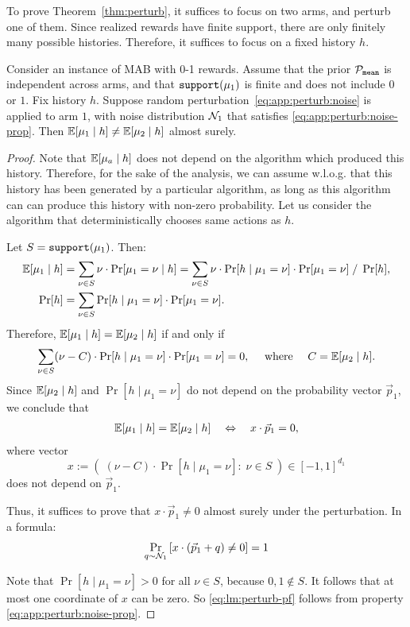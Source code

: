 To prove Theorem~\ref{thm:perturb}, it suffices to focus on two arms, and perturb one of them. Since realized rewards have finite support, there are only finitely many possible histories. Therefore, it suffices to focus on a fixed history $h$.

\begin{lemma}\label{lm:perturb}
Consider an instance of MAB with 0-1 rewards. Assume that the prior $\mathcal{P}_\mathtt{mean}$ is independent across arms, and that $\mathtt{support}(\mu_1)$ is finite and does not include $0$ or $1$. Fix history $h$. Suppose random perturbation~\eqref{eq:app:perturb:noise} is applied to arm $1$, with noise distribution $\mathcal{N}_1$ that satisfies \eqref{eq:app:perturb:noise-prop}. Then
    $\E[\mu_1\mid h] \neq \E[\mu_2\mid h] $
almost surely.
\end{lemma}

\begin{proof}
Note that $\E[\mu_a\mid h]$ does not depend on the algorithm which produced this history. Therefore, for the sake of the analysis, we can assume w.l.o.g. that this history has been generated by a particular algorithm, as long as this algorithm can can produce this history with non-zero probability. Let us consider  the algorithm that deterministically chooses same actions as $h$.

Let $S = \mathtt{support}(\mu_1)$. Then:
\begin{align*}
\E[\mu_1\mid h]
    &= \sum_{\nu\in S} \nu \cdot \Pr[\mu_1 =\nu \mid h]
    = \sum_{\nu\in S} \nu \cdot \Pr[h \mid \mu_1 =\nu] \cdot \Pr[\mu_1=\nu]\;/\;\Pr[h], \\
\Pr[h]
    &= \sum_{\nu\in S} \Pr[h \mid \mu_1 =\nu] \cdot \Pr[\mu_1=\nu].
\end{align*}
Therefore,
    $\E[\mu_1\mid h] = \E[\mu_2\mid h] $
if and only if
\begin{align*}
\sum_{\nu\in S} (\nu-C) \cdot \Pr[h \mid \mu_1 =\nu] \cdot \Pr[\mu_1=\nu] = 0,
\quad\text{ where }\quad C=\E[\mu_2\mid h].
\end{align*}
Since $\E[\mu_2\mid h]$ and $\Pr[h \mid \mu_1 =\nu]$ do not depend on the probability vector $\vec{p}_1$, we conclude that
\begin{align*}
  \E[\mu_1\mid h] = \E[\mu_2\mid h]
\quad\Leftrightarrow\quad x\cdot \vec{p}_1 =0,
\end{align*}
where vector
    \[ x := \left(\; (\nu-C) \cdot \Pr[h \mid \mu_1 =\nu]:\; \nu\in S\; \right) \in [-1,1]^{d_1}\]
does not depend on $\vec{p}_1$.

Thus, it suffices to prove that $x\cdot \vec{p}_1 \neq 0$ almost surely under the perturbation. In a formula:
\begin{align}\label{eq:lm:perturb-pf}
    \Pr_{q\sim \mathcal{N}_1}\left[ x\cdot( \vec{p}_1+q) \neq 0 \right] =1
\end{align}

Note that $\Pr[h \mid \mu_1 =\nu]>0$ for all $\nu\in S$, because $0,1\not\in S$. It follows that at most one coordinate of $x$ can be zero. So  \eqref{eq:lm:perturb-pf} follows from property \eqref{eq:app:perturb:noise-prop}.
\end{proof}
